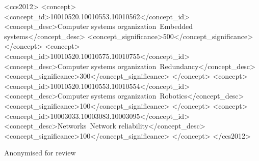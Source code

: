 \documentclass[acmlarge,screen]{acmart}
\begin{document}
\begin{CCSXML}
<ccs2012>
 <concept>
  <concept_id>10010520.10010553.10010562</concept_id>
  <concept_desc>Computer systems organization~Embedded systems</concept_desc>
  <concept_significance>500</concept_significance>
 </concept>
 <concept>
  <concept_id>10010520.10010575.10010755</concept_id>
  <concept_desc>Computer systems organization~Redundancy</concept_desc>
  <concept_significance>300</concept_significance>
 </concept>
 <concept>
  <concept_id>10010520.10010553.10010554</concept_id>
  <concept_desc>Computer systems organization~Robotics</concept_desc>
  <concept_significance>100</concept_significance>
 </concept>
 <concept>
  <concept_id>10003033.10003083.10003095</concept_id>
  <concept_desc>Networks~Network reliability</concept_desc>
  <concept_significance>100</concept_significance>
 </concept>
</ccs2012>
\end{CCSXML}




\maketitle









\begin{acks}
Anonymised for review
\end{acks}



\end{document}
